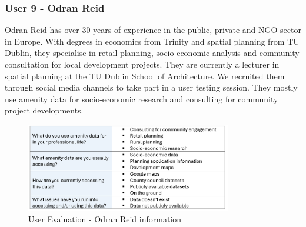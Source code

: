 \subsubsection{User 9 - Odran Reid}
Odran Reid has over 30 years of experience in the public,
private and NGO sector in Europe. With degrees in economics from Trinity and
spatial planning from TU Dublin, they specialise in retail planning,
socio-economic analysis and community consultation for local development
projects. They are currently a lecturer in spatial planning at the TU Dublin
School of Architecture. We recruited them through social media channels to take
part in a user testing session. They mostly use amenity data for socio-economic
research and consulting for community project developments.

\begin{figure}[h!]
    \centering
    \includegraphics[width=0.8\textwidth]{images/odran-amenity-info.png}
    \caption{User Evaluation - Odran Reid information}
\end{figure}

